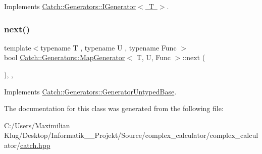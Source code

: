 Implements \mbox{\hyperlink{struct_catch_1_1_generators_1_1_i_generator_a525d381fc9249a885b075a0632a8579a}{Catch\+::\+Generators\+::\+I\+Generator$<$ T $>$}}.

\mbox{\label{class_catch_1_1_generators_1_1_map_generator_aa07e2f12d38ae060c30cc30d9dc236c5}} 
\subsubsection{\texorpdfstring{next()}{next()}}
{\footnotesize\ttfamily template$<$typename T , typename U , typename Func $>$ \\
bool \mbox{\hyperlink{class_catch_1_1_generators_1_1_map_generator}{Catch\+::\+Generators\+::\+Map\+Generator}}$<$ T, U, Func $>$\+::next (\begin{DoxyParamCaption}{ }\end{DoxyParamCaption})\hspace{0.3cm}{\ttfamily [inline]}, {\ttfamily [override]}, {\ttfamily [virtual]}}



Implements \mbox{\hyperlink{class_catch_1_1_generators_1_1_generator_untyped_base_aeed3c0cd6233c5f553549e453b8d6638}{Catch\+::\+Generators\+::\+Generator\+Untyped\+Base}}.



The documentation for this class was generated from the following file\+:\begin{DoxyCompactItemize}
\item 
C\+:/\+Users/\+Maximilian Klug/\+Desktop/\+Informatik\+\_\+\_\+\+Projekt/\+Source/complex\+\_\+calculator/complex\+\_\+calculator/\mbox{\hyperlink{catch_8hpp}{catch.\+hpp}}\end{DoxyCompactItemize}
